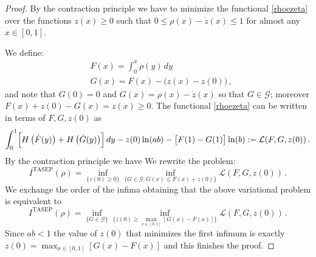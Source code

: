 \documentclass[10pt,a4paper]{amsart}
\begin{document}
	\begin{proof}
		By the contraction principle  we have to  minimize the functional \eqref{rhoezeta} over the functions $z(x) \ge 0$ such that $0 \le \rho(x)-\dot z(x) \le 1$ for almost any $x\in[0,1]$.
		
		We define:
		\begin{align*}
			& F(x)= \int_0^x \rho(y)\,dy \\
			&G(x)=F(x)-\Big(z(x)-z(0)\Big)\,,
		\end{align*}
		and note that $G(0)=0$ and $\dot G(x)=\rho(x)-\dot z(x)$ so that $G\in \mathcal G$; moreover $F(x)+z(0)-G(x)=z(x)\geq 0$.
		The functional \eqref{rhoezeta} can be written in terms of $F, G, z(0)$ as
		$$
		\int_0^1 \Bigl[H\left(\dot F(y)\right) + H\left(\dot{G}(y)\right)\Bigr]\, dy  
		-z(0)\ln(ab)-\bigl[F(1)-G(1)\bigr]\ln(b):=\mathcal L(F, G, z(0))\,.
		$$
		By the contraction principle we have
		We rewrite the problem:
		\begin{equation*}
			I^{\mathrm{TASEP}}(\rho)=\inf_{\big\{z(0) \ge 0\big\}}  \inf_{\big\{G\in \mathcal G : G(x) \le F(x)+z(0)\big\}} \mathcal{L}(F, G, z(0)) \,.
		\end{equation*}
		We exchange the order of the infima obtaining that the above variational problem is equivalent to
		\begin{equation*}
			I^{\mathrm{TASEP}}(\rho)=\inf_{\big\{G\in \mathcal G\big\}}  \inf_{\big\{z(0)\ge \max_{x \in [0,1]}[G(x)-F(x)]\big\}} \mathcal{L}(F, G, z(0)) \,.
		\end{equation*}
		Since $ab<1$ the value of $z(0)$ that minimizes the first infimum is exactly $z(0)= \max_{x \in [0,1]}[G(x)-F(x)]$ and this finishes the proof.
	\end{proof}
\end{document}
